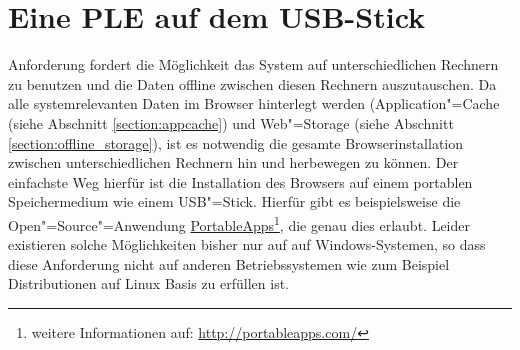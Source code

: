 \section{Eine PLE auf dem USB-Stick}\label{section:ple_auf_usb}
Anforderung  fordert die Möglichkeit das System auf unterschiedlichen Rechnern zu benutzen und die Daten offline zwischen diesen Rechnern auszutauschen. Da alle systemrelevanten Daten im Browser hinterlegt werden (Application"=Cache (siehe Abschnitt \ref{section:appcache}) und Web"=Storage (siehe Abschnitt \ref{section:offline_storage}), ist es notwendig die gesamte Browserinstallation zwischen unterschiedlichen Rechnern hin und herbewegen zu können. Der einfachste Weg hierfür ist die Installation des Browsers auf einem portablen Speichermedium wie einem USB"=Stick. Hierfür gibt es beispielsweise die Open"=Source"=Anwendung \href{http://portableapps.com/}{PortableApps}\footnote{weitere Informationen auf: \url{http://portableapps.com/}}, die genau dies erlaubt. Leider existieren solche Möglichkeiten bisher nur auf auf Windows-Systemen, so dass diese Anforderung nicht auf anderen Betriebssystemen wie zum Beispiel Distributionen auf Linux Basis zu erfüllen ist. 